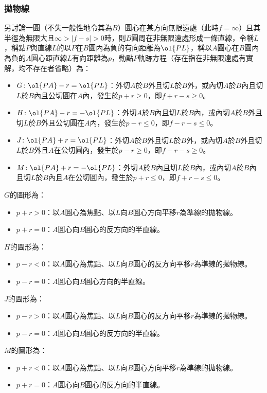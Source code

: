 \documentclass[a4paper,12pt]{article}
\begin{document}
\subsubsection{拋物線}
另討論一圓（不失一般性地令其為$B$）圓心在某方向無限遠處（此時$f=\infty$）且其半徑為無限大且$\infty>|f-s|>0$時，則$B$圓周在非無限遠處形成一條直線，令稱$L$，稱點$P$與直線$L$的以$P$在$B$圓內為負的有向距離為$\ol{PL}$，稱以$A$圓心在$B$圓內為負的$A$圓心距直線$L$有向距離為$p$，動點$P$軌跡方程（存在指在非無限遠處有實解，均不存在者省略）為：
\begin{itemize}
\item $G\colon\ol{PA}-r=\ol{PL}$：外切$A$於$B$外且切$L$於$B$外，或內切$A$於$B$內且切$L$於$B$內且公切圓在$A$內，發生於$p+r\geq 0$，即$f+r-s\geq 0$。
\item $H\colon\ol{PA}-r=-\ol{PL}$：外切$A$於$B$內且切$L$於$B$內，或內切$A$於$B$外且切$L$於$B$外且公切圓在$A$內，發生於$p-r\leq 0$，即$f-r-s\leq 0$。
\item $J\colon\ol{PA}+r=\ol{PL}$：外切$A$於$B$外且切$L$於$B$外，或內切$A$於$B$外且切$L$於$B$外且$A$在公切圓內，發生於$p-r\geq 0$，即$f-r-s\geq 0$。
\item $M\colon\ol{PA}+r=-\ol{PL}$：外切$A$於$B$內且切$L$於$B$內，或內切$A$於$B$內且切$L$於$B$內且$A$在公切圓內，發生於$p+r\leq 0$，即$f+r-s\leq 0$。
\end{itemize}
$G$的圖形為：
\begin{itemize}
\item $p+r>0$：以$A$圓心為焦點、以$L$向$B$圓心方向平移$r$為準線的拋物線。
\item $p+r=0$：$A$圓心向$B$圓心的反方向的半直線。
\end{itemize}
$H$的圖形為：
\begin{itemize}
\item $p-r<0$：以$A$圓心為焦點、以$L$向$B$圓心的反方向平移$r$為準線的拋物線。
\item $p-r=0$：$A$圓心向$B$圓心方向的半直線。
\end{itemize}
$J$的圖形為：
\begin{itemize}
\item $p-r>0$：以$A$圓心為焦點、以$L$向$B$圓心的反方向平移$r$為準線的拋物線。
\item $p-r=0$：$A$圓心向$B$圓心的反方向的半直線。
\end{itemize}
$M$的圖形為：
\begin{itemize}
\item $p+r<0$：以$A$圓心為焦點、以$L$向$B$圓心方向平移$r$為準線的拋物線。
\item $p+r=0$：$A$圓心向$B$圓心的反方向的半直線。
\end{itemize}
\end{document}

